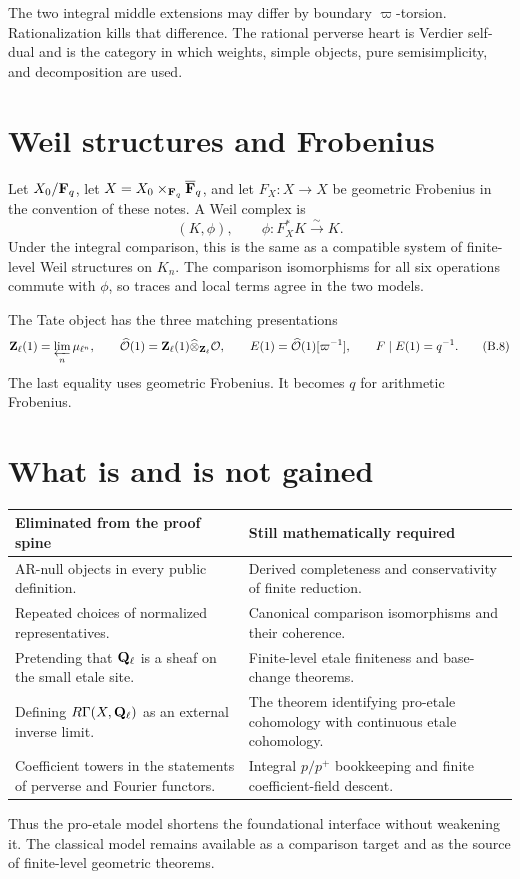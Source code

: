 The two integral middle extensions may differ by boundary
\(\varpi\)-torsion.  Rationalization kills that difference.  The rational
perverse heart is Verdier self-dual and is the category in which weights,
simple objects, pure semisimplicity, and decomposition are used.

\section{Weil structures and Frobenius}

Let \(X_0/\mathbf F_q\), let \(X=X_0\times_{\mathbf F_q}\overline{\mathbf F}_q\), and let
\(F_X:X\to X\) be geometric Frobenius in the convention of these notes.  A
Weil complex is
\[
  (K,\phi),\qquad
  \phi:F_X^*K\xrightarrow{\sim}K.
\tag{B.7}\label{eq:dictionary-weil-object}
\]
Under the integral comparison, this is the same as a compatible system of
finite-level Weil structures on \(K_n\).  The comparison isomorphisms for all
six operations commute with \(\phi\), so traces and local terms agree in the
two models.

The Tate object has the three matching presentations
\[
 \mathbf Z_\ell(1)=\varprojlim_n\mu_{\ell^n},
 \qquad
 \widehat{\mathcal O}(1)
   =\mathbf Z_\ell(1)\widehat{\otimes}_{\mathbf Z_\ell}\mathcal O,
\qquad
 E(1)=\widehat{\mathcal O}(1)[\varpi^{-1}],
\qquad
 F\mid E(1)=q^{-1}.
\tag{B.8}\label{eq:dictionary-tate}
\]
The last equality uses geometric Frobenius.  It becomes \(q\) for arithmetic
Frobenius.

\section{What is and is not gained}

\begin{longtable}{
 >{\raggedright\arraybackslash}p{}
 >{\raggedright\arraybackslash}p{}}
\toprule
Eliminated from the proof spine & Still mathematically required\\
\midrule
\endhead
AR-null objects in every public definition. &
Derived completeness and conservativity of finite reduction.\\

Repeated choices of normalized representatives. &
Canonical comparison isomorphisms and their coherence.\\

Pretending that \(\mathbf Q_\ell\) is a sheaf on the small etale site. &
Finite-level etale finiteness and base-change theorems.\\

Defining \(R\Gamma(X,\mathbf Q_\ell)\) as an external inverse limit. &
The theorem identifying pro-etale cohomology with continuous etale
cohomology.\\

Coefficient towers in the statements of perverse and Fourier functors. &
Integral \(p/p^+\) bookkeeping and finite coefficient-field descent.\\
\bottomrule
\end{longtable}

Thus the pro-etale model shortens the foundational interface without
weakening it.  The classical model remains available as a comparison target
and as the source of finite-level geometric theorems.
